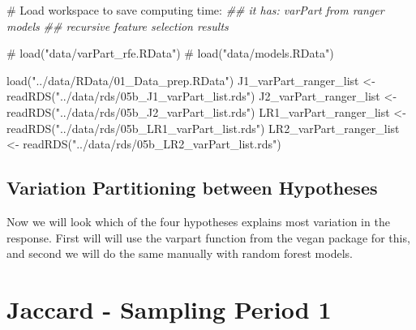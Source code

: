 \documentclass[
  letterpaper,
  DIV=11,
  numbers=noendperiod]{scrreprt}
\newenvironment{Shaded}{\begin{snugshade}}{\end{snugshade}}
\newcommand{\CommentTok}[1]{\textcolor[rgb]{0.37,0.37,0.37}{#1}}
\newcommand{\DocumentationTok}[1]{\textcolor[rgb]{0.37,0.37,0.37}{\textit{#1}}}
\newcommand{\FunctionTok}[1]{\textcolor[rgb]{0.28,0.35,0.67}{#1}}
\newcommand{\NormalTok}[1]{\textcolor[rgb]{0.00,0.23,0.31}{#1}}
\newcommand{\OtherTok}[1]{\textcolor[rgb]{0.00,0.23,0.31}{#1}}
\newcommand{\StringTok}[1]{\textcolor[rgb]{0.13,0.47,0.30}{#1}}
\begin{document}
\begin{Shaded}
\begin{Highlighting}[]
\CommentTok{\# Load workspace to save computing time:}
\DocumentationTok{\#\# it has: varPart from ranger models}
\DocumentationTok{\#\# recursive feature selection results}

\CommentTok{\# load("data/varPart\_rfe.RData")}
\CommentTok{\# load("data/models.RData")}

\FunctionTok{load}\NormalTok{(}\StringTok{"../data/RData/01\_Data\_prep.RData"}\NormalTok{)}
\NormalTok{J1\_varPart\_ranger\_list }\OtherTok{\textless{}{-}} \FunctionTok{readRDS}\NormalTok{(}\StringTok{"../data/rds/05b\_J1\_varPart\_list.rds"}\NormalTok{)}
\NormalTok{J2\_varPart\_ranger\_list }\OtherTok{\textless{}{-}} \FunctionTok{readRDS}\NormalTok{(}\StringTok{"../data/rds/05b\_J2\_varPart\_list.rds"}\NormalTok{)}
\NormalTok{LR1\_varPart\_ranger\_list }\OtherTok{\textless{}{-}} \FunctionTok{readRDS}\NormalTok{(}\StringTok{"../data/rds/05b\_LR1\_varPart\_list.rds"}\NormalTok{)}
\NormalTok{LR2\_varPart\_ranger\_list }\OtherTok{\textless{}{-}} \FunctionTok{readRDS}\NormalTok{(}\StringTok{"../data/rds/05b\_LR2\_varPart\_list.rds"}\NormalTok{)}
\end{Highlighting}
\end{Shaded}

\subsection{Variation Partitioning between
Hypotheses}\label{variation-partitioning-between-hypotheses}

Now we will look which of the four hypotheses explains most variation in
the response. First will will use the varpart function from the vegan
package for this, and second we will do the same manually with random
forest models.

\section{Jaccard - Sampling Period 1}
\end{document}
